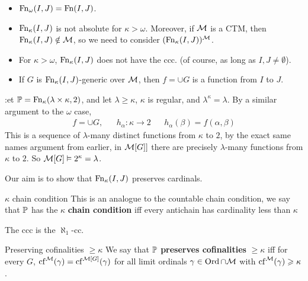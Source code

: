 \documentclass{article}
\begin{document}
    \begin{remark*}
        \hspace{0.1cm}
        \begin{itemize}
            \item $\operatorname{Fn}_{\omega}(I,J) = \operatorname{Fn}(I,J)$.
            \item $\operatorname{Fn}_{\kappa}(I,J)$ is not absolute for $\kappa> \omega$. Moreover, if $\mathcal{M}$ is a CTM, then $\operatorname{Fn}_{\kappa}(I,J) \notin \mathcal{M}$, so we need to consider $(\operatorname{Fn}_{\kappa}(I,J))^{\mathcal{M}}$.
            \item For $\kappa > \omega$, $\operatorname{Fn}_{\kappa}(I,J)$ does not have the ccc. (of course, as long as $I,J \neq \emptyset$).
            \item If $G$ is $\operatorname{Fn}_{\kappa}(I,J)$-generic over $\mathcal{M}$, then $f=\cup G$ is a function from $I$ to $J$.
        \end{itemize}
        :et $\mathbb{P} = \operatorname{Fn}_{\kappa}(\lambda \times \kappa,2)$, and let $\lambda \geq \kappa$, $\kappa$ is regular, and $\lambda^{\kappa}=\lambda$. By a similar argument to the $\omega$ case, \begin{align*}
            f = \cup G, &  & h_{\alpha} : \kappa \to 2 &  & h_{\alpha}(\beta) = f(\alpha, \beta)
        \end{align*}
        This is a sequence of $\lambda$-many distinct functions from $\kappa$ to $2$, by the exact same  names argument from earlier, in $\mathcal{M}[G]]$ there are precisely $\lambda$-many functions from $\kappa$ to $2$. So $\mathcal{M}[G] \vDash 2^{\kappa} = \lambda$.
    \end{remark*}
    Our aim is to show that $\operatorname{Fn}_{\kappa}(I,J)$ preserves cardinals.
    \begin{fancydefine}{$\kappa$ chain condition}
        This is an analogue to the countable chain condition, we say that $\mathbb{P}$ has the $\kappa$\textbf{ chain condition} iff every antichain has cardinality less than $\kappa$
    \end{fancydefine}
    \begin{remark*}
        The ccc is the $\aleph_{1}$-cc.
    \end{remark*}
    \begin{fancydefine}{Preserving cofinalities $\geq \kappa$}
        We say that $\mathbb{P}$ \textbf{preserves cofinalities} $\geq \kappa$ iff for every $G$, $\operatorname{cf}^{\mathcal{M}}(\gamma) = \operatorname{cf}^{\mathcal{M}[G]}(\gamma)$ for all limit ordinals $\gamma \in \operatorname{Ord} \cap \mathcal{M}$ with $\operatorname{cf}^{\mathcal{M}}(\gamma)\geqslant \kappa$.
    \end{fancydefine}
\end{document}
